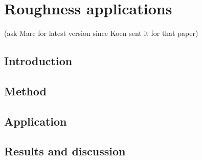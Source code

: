 \newpage
\section{Roughness applications}

\hypertarget{Concepts:IPEMCalcRoughnessOverSubparts}{}
\hypertarget{Concepts:IPEMGeneratePitchShiftScript}{}

\IPEMTBC (ask Marc for latest version since Koen sent it for that paper)

\subsection{Introduction}

\subsection{Method}

\subsection{Application}

\subsection{Results and discussion}

